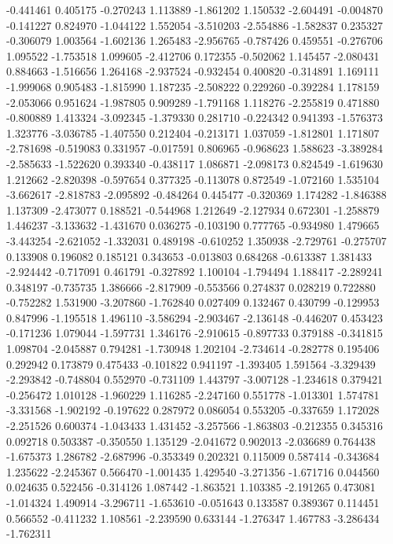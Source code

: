 -0.441461
0.405175
-0.270243
1.113889
-1.861202
1.150532
-2.604491
-0.004870
-0.141227
0.824970
-1.044122
1.552054
-3.510203
-2.554886
-1.582837
0.235327
-0.306079
1.003564
-1.602136
1.265483
-2.956765
-0.787426
0.459551
-0.276706
1.095522
-1.753518
1.099605
-2.412706
0.172355
-0.502062
1.145457
-2.080431
0.884663
-1.516656
1.264168
-2.937524
-0.932454
0.400820
-0.314891
1.169111
-1.999068
0.905483
-1.815990
1.187235
-2.508222
0.229260
-0.392284
1.178159
-2.053066
0.951624
-1.987805
0.909289
-1.791168
1.118276
-2.255819
0.471880
-0.800889
1.413324
-3.092345
-1.379330
0.281710
-0.224342
0.941393
-1.576373
1.323776
-3.036785
-1.407550
0.212404
-0.213171
1.037059
-1.812801
1.171807
-2.781698
-0.519083
0.331957
-0.017591
0.806965
-0.968623
1.588623
-3.389284
-2.585633
-1.522620
0.393340
-0.438117
1.086871
-2.098173
0.824549
-1.619630
1.212662
-2.820398
-0.597654
0.377325
-0.113078
0.872549
-1.072160
1.535104
-3.662617
-2.818783
-2.095892
-0.484264
0.445477
-0.320369
1.174282
-1.846388
1.137309
-2.473077
0.188521
-0.544968
1.212649
-2.127934
0.672301
-1.258879
1.446237
-3.133632
-1.431670
0.036275
-0.103190
0.777765
-0.934980
1.479665
-3.443254
-2.621052
-1.332031
0.489198
-0.610252
1.350938
-2.729761
-0.275707
0.133908
0.196082
0.185121
0.343653
-0.013803
0.684268
-0.613387
1.381433
-2.924442
-0.717091
0.461791
-0.327892
1.100104
-1.794494
1.188417
-2.289241
0.348197
-0.735735
1.386666
-2.817909
-0.553566
0.274837
0.028219
0.722880
-0.752282
1.531900
-3.207860
-1.762840
0.027409
0.132467
0.430799
-0.129953
0.847996
-1.195518
1.496110
-3.586294
-2.903467
-2.136148
-0.446207
0.453423
-0.171236
1.079044
-1.597731
1.346176
-2.910615
-0.897733
0.379188
-0.341815
1.098704
-2.045887
0.794281
-1.730948
1.202104
-2.734614
-0.282778
0.195406
0.292942
0.173879
0.475433
-0.101822
0.941197
-1.393405
1.591564
-3.329439
-2.293842
-0.748804
0.552970
-0.731109
1.443797
-3.007128
-1.234618
0.379421
-0.256472
1.010128
-1.960229
1.116285
-2.247160
0.551778
-1.013301
1.574781
-3.331568
-1.902192
-0.197622
0.287972
0.086054
0.553205
-0.337659
1.172028
-2.251526
0.600374
-1.043433
1.431452
-3.257566
-1.863803
-0.212355
0.345316
0.092718
0.503387
-0.350550
1.135129
-2.041672
0.902013
-2.036689
0.764438
-1.675373
1.286782
-2.687996
-0.353349
0.202321
0.115009
0.587414
-0.343684
1.235622
-2.245367
0.566470
-1.001435
1.429540
-3.271356
-1.671716
0.044560
0.024635
0.522456
-0.314126
1.087442
-1.863521
1.103385
-2.191265
0.473081
-1.014324
1.490914
-3.296711
-1.653610
-0.051643
0.133587
0.389367
0.114451
0.566552
-0.411232
1.108561
-2.239590
0.633144
-1.276347
1.467783
-3.286434
-1.762311
